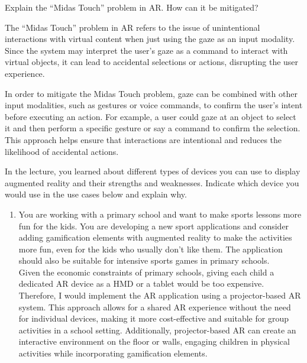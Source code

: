 \begin{ejercicio}
    Explain the ``Midas Touch'' problem in AR. How can it be mitigated?

    The ``Midas Touch'' problem in AR refers to the issue of unintentional interactions with virtual content when just using the gaze as an input modality. Since the system may interpret the user's gaze as a command to interact with virtual objects, it can lead to accidental selections or actions, disrupting the user experience.

    In order to mitigate the Midas Touch problem, gaze can be combined with other input modalities, such as gestures or voice commands, to confirm the user's intent before executing an action. For example, a user could gaze at an object to select it and then perform a specific gesture or say a command to confirm the selection. This approach helps ensure that interactions are intentional and reduces the likelihood of accidental actions.
\end{ejercicio}

\begin{ejercicio}
    In the lecture, you learned about different types of devices you can use to display augmented reality and their strengths and weaknesses. Indicate which device you would use in the use cases below and explain why.
    \begin{enumerate}
        \item You are working with a primary school and want to make sports lessons more fun for the kids. You are developing a new sport applications and consider adding gamification elements with augmented reality to make the activities more fun, even for the kids who usually don't like them. The application should also be suitable for intensive sports games in primary schools.\\
        
        Given the economic constraints of primary schools, giving each child a dedicated AR device as a HMD or a tablet would be too expensive. Therefore, I would implement the AR application using a projector-based AR system. This approach allows for a shared AR experience without the need for individual devices, making it more cost-effective and suitable for group activities in a school setting. Additionally, projector-based AR can create an interactive environment on the floor or walls, engaging children in physical activities while incorporating gamification elements.
    \end{enumerate}
\end{ejercicio}